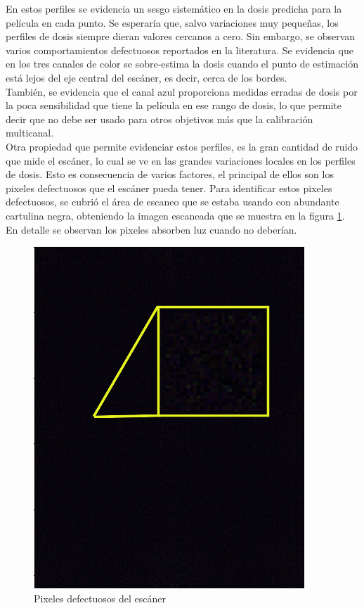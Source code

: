 En estos perfiles se evidencia un sesgo sistemático en la dosis predicha para la película en cada punto. Se esperaría que, salvo variaciones muy pequeñas, los perfiles de dosis siempre dieran valores cercanos a cero. Sin embargo, se observan varios comportamientos defectuosos reportados en la literatura. Se evidencia que en los tres canales de color se sobre-estima la dosis cuando el punto de estimación está lejos del eje central del escáner, es decir, cerca de los bordes.\\

También, se evidencia que el canal azul proporciona medidas erradas de dosis por la poca sensibilidad que tiene la película en ese rango de dosis, lo que permite decir que no debe ser usado para otros objetivos más que la calibración multicanal.\\

Otra propiedad que permite evidenciar estos perfiles, es la gran cantidad de ruido que mide el escáner, lo cual se ve en las grandes variaciones locales en los perfiles de dosis. Esto es consecuencia de varios factores, el principal de ellos son los pixeles defectuosos que el escáner pueda tener. Para identificar estos pixeles defectuosos, se cubrió el área de escaneo que se estaba usando con abundante cartulina negra, obteniendo la imagen escaneada que se muestra en la figura \ref{fig:fondoNegro}. En detalle se observan los pixeles absorben luz cuando no deberían. \\

\begin{figure}[H]
	\centering
	\includegraphics[width=0.7\linewidth]{images/fonRuido.png}
	\caption{Pixeles defectuosos del escáner }
	\label{fig:fondoNegro}
\end{figure}

